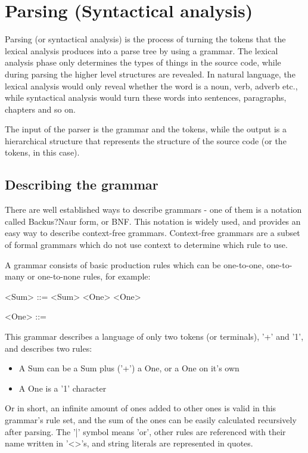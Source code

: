 \chapter{Parsing (Syntactical analysis)}
Parsing (or syntactical analysis) is the process of turning the tokens that the lexical analysis produces into a parse tree by using a grammar. The lexical analysis phase only determines the types of things in the source code, while during parsing the higher level structures are revealed. In natural language, the lexical analysis would only reveal whether the word is a noun, verb, adverb etc., while syntactical analysis would turn these words into sentences, paragraphs, chapters and so on.

The input of the parser is the grammar and the tokens, while the output is a hierarchical structure that represents the structure of the source code (or the tokens, in this case).
\section{Describing the grammar}
There are well established ways to describe grammars - one of them is a notation called Backus?Naur form, or BNF. This notation is widely used, and provides an easy way to describe context-free grammars. Context-free grammars are a subset of formal grammars which do not use context to determine which rule to use.

A grammar consists of basic production rules which can be one-to-one, one-to-many or one-to-none rules, for example:
\begin{grammar}
<Sum> ::= <Sum> \lit{+} <One>
    \alt <One> 

<One> ::= 
\end{grammar}

This grammar describes a language of only two tokens (or terminals), '+' and '1', and describes two rules:
\begin{itemize}
\item A Sum can be a Sum plus ('+') a One, or a One on it's own
\item A One is a '1' character
\end{itemize}
Or in short, an infinite amount of ones added to other ones is valid in this grammar's rule set, and the sum of the ones can be easily calculated recursively after parsing. The '|' symbol means 'or', other rules are referenced with their name written in '<>'s, and string literals are represented in quotes.

